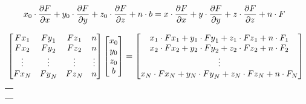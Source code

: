 \documentclass[manuscript,revised]{geophysics}
\begin{document}
\bigskip


\begin{equation} \label{eq:euler2}
\centering
x_0 \cdot \frac{\partial F}{\partial x} + y_0 \cdot \frac{\partial F}{\partial y} + z_0 \cdot \frac{\partial F}{\partial z} + n \cdot b = x \cdot \frac{\partial F}{\partial x} + y \cdot \frac{\partial F}{\partial y} + z \cdot \frac{\partial F}{\partial z} + n \cdot F  \ \ 
\end{equation}


\begin{equation} \label{eq:euler3}
\centering
\left[\begin{matrix}{Fx}_1&{Fy}_1&{Fz}_1&n\\{Fx}_2&{Fy}_2&{Fz}_2&n\\\vdots&\vdots&\vdots&\vdots\\{Fx}_N&{Fy}_N&{Fz}_N&n\\\end{matrix}\right]\left[\begin{matrix}x_0\\y_0\\z_0\\b\\\end{matrix}\right]=\left[\begin{matrix}x_1\cdot{Fx}_1+y_1 \cdot {Fy}_1+z_1 \cdot {Fz}_1+n\cdot F_1\\x_2\cdot{Fx}_2+y_2\cdot{Fy}_2+z_2\cdot{Fz}_2+n\cdot F_2\\\vdots\\x_N\cdot{Fx}_N+y_N\cdot{Fy}_N+z_N\cdot{Fz}_N+n\cdot F_N\\\end{matrix}\right]\ 
\end{equation}

\begin{tabular}{ l }
\noindent{Where: $Fx_i$, $Fy_i$ and $Fz_i$ represent, respectively, the gradients $\frac{\partial F}{\partial x}$, $\frac{\partial F}{\partial y}$ and $\frac{\partial F}{\partial z}$}   \\
\noindent{evaluated on the i-th observation point ($i=1,2, ..., N$). While $x_i$, $y_i$ and $z_i$}   \\
\noindent{represent the cartesian coordinates at the i-th observation point.}
\end{tabular}
\end{document}
